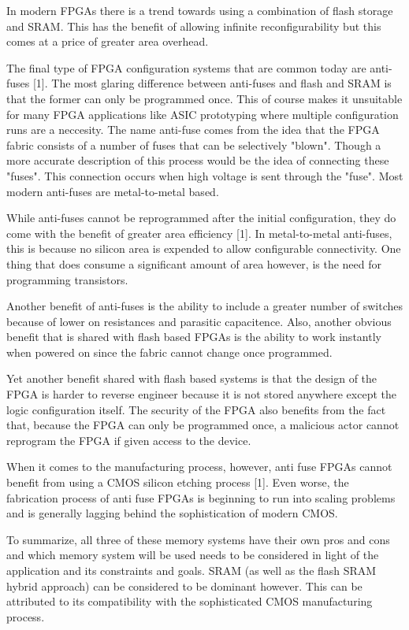 \documentclass{article}
\begin{document}
    In modern FPGAs there is a trend towards using a combination of flash storage and SRAM.
    This has the benefit of allowing infinite reconfigurability but this comes at a price
    of greater area overhead.

    The final type of FPGA configuration systems that are common today are anti-fuses [1].
    The most glaring difference between anti-fuses and flash and SRAM is that the former
    can only be programmed once. This of course makes it unsuitable for many FPGA applications
    like ASIC prototyping where multiple configuration runs are a neccesity.
    The name anti-fuse comes from the idea that the FPGA fabric consists of a number of fuses
    that can be selectively "blown". Though a more accurate description of this process
    would be the idea of connecting these "fuses". This connection occurs when high voltage
    is sent through the "fuse". Most modern anti-fuses are metal-to-metal based.

    While anti-fuses cannot be reprogrammed after the initial configuration,
    they do come with the benefit of greater area efficiency [1]. In metal-to-metal
    anti-fuses, this is because no silicon area is expended to allow configurable connectivity.
    One thing that does consume a significant amount of area however, is the need for
    programming transistors.

    Another benefit of anti-fuses is the ability to include a greater number of switches
    because of lower on resistances and parasitic capacitence. Also,
    another obvious benefit that is shared with flash based FPGAs is the ability to
    work instantly when powered on since the fabric cannot change once programmed.

    Yet another benefit shared with flash based systems is that the design
    of the FPGA is harder to reverse engineer because it is not stored anywhere except
    the logic configuration itself. The security of the FPGA also benefits from the
    fact that, because the FPGA can only be programmed once, a malicious actor
    cannot reprogram the FPGA if given access to the device.

    When it comes to the manufacturing process, however, anti fuse FPGAs cannot
    benefit from using a CMOS silicon etching process [1]. Even worse,
    the fabrication process of anti fuse FPGAs is beginning to run into scaling problems
    and is generally lagging behind the sophistication of modern CMOS.

    To summarize, all three of these memory systems have their own pros and cons and
    which memory system will be used needs to be considered in light of the application
    and its constraints and goals. SRAM (as well as the flash SRAM hybrid approach) can
    be considered to be dominant however. This can be attributed to its compatibility
    with the sophisticated CMOS manufacturing process.
    
\end{document}
